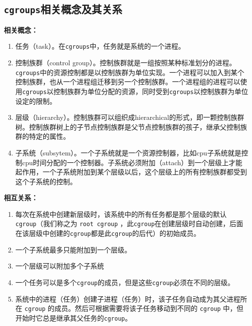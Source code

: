 \documentclass[doctor,openright,twoside]{sjtuthesis}
\providecommand{\tightlist}{%
    \setlength{\itemsep}{0pt}\setlength{\parskip}{0pt}}
\newcommand{\passthrough}[1]{#1}
\theoremstyle{plain}
\theoremstyle{definition}
\theoremstyle{remark}
\theoremstyle{ocrenumbox}
\theoremstyle{plain}
\begin{document}
\hypertarget{cgroups-3}{%
\subsection{\texorpdfstring{\texttt{cgroups}相关概念及其关系}{cgroups相关概念及其关系}}\label{cgroups-3}}

\textbf{相关概念：}

\begin{enumerate}
\def\labelenumi{\arabic{enumi}.}
\tightlist
\item
  任务（task）。在\passthrough{\lstinline!cgroups!}中，任务就是系统的一个进程。
\item
  控制族群（control group）。控制族群就是一组按照某种标准划分的进程。\passthrough{\lstinline!cgroups!}中的资源控制都是以控制族群为单位实现。一个进程可以加入到某个控制族群，也从一个进程组迁移到另一个控制族群。一个进程组的进程可以使用\passthrough{\lstinline!cgroups!}以控制族群为单位分配的资源，同时受到\passthrough{\lstinline!cgroups!}以控制族群为单位设定的限制。
\item
  层级（hierarchy）。控制族群可以组织成hierarchical的形式，即一颗控制族群树。控制族群树上的子节点控制族群是父节点控制族群的孩子，继承父控制族群的特定的属性。
\item
  子系统（subsytem）。一个子系统就是一个资源控制器，比如cpu子系统就是控制cpu时间分配的一个控制器。子系统必须附加（attach）到一个层级上才能起作用，一个子系统附加到某个层级以后，这个层级上的所有控制族群都受到这个子系统的控制。
\end{enumerate}

\textbf{相互关系：}

\begin{enumerate}
\def\labelenumi{\arabic{enumi}.}
\tightlist
\item
  每次在系统中创建新层级时，该系统中的所有任务都是那个层级的默认 \passthrough{\lstinline!cgroup!}（我们称之为 \passthrough{\lstinline!root cgroup!} ，此\passthrough{\lstinline!cgroup!}在创建层级时自动创建，后面在该层级中创建的\passthrough{\lstinline!cgroup!}都是此\passthrough{\lstinline!cgroup!}的后代）的初始成员。
\item
  一个子系统最多只能附加到一个层级。
\item
  一个层级可以附加多个子系统
\item
  一个任务可以是多个\passthrough{\lstinline!cgroup!}的成员，但是这些\passthrough{\lstinline!cgroup!}必须在不同的层级。
\item
  系统中的进程（任务）创建子进程（任务）时，该子任务自动成为其父进程所在 \passthrough{\lstinline!cgroup!} 的成员。然后可根据需要将该子任务移动到不同的 \passthrough{\lstinline!cgroup!} 中，但开始时它总是继承其父任务的\passthrough{\lstinline!cgroup!}。
\end{enumerate}
\end{document}
